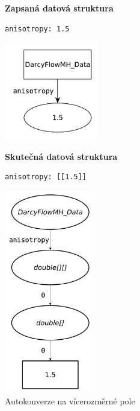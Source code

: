 \documentclass[FM,bw,DP]{tulthesis}
\begin{document}
\begin{figure}[ht]
\begin{minipage}[t]{0.45\linewidth}
\vspace{0pt}
\textbf{Zapsaná datová struktura}\\
\vspace{-5pt}
\begin{lstlisting}
anisotropy: 1.5
\end{lstlisting}
\vspace*{-20pt}
\begin{center}
\includegraphics[height=120pt]{../img/autoconversion_array_2_before.pdf}
\end{center}
\end{minipage}
\quad
\begin{minipage}[t]{0.45\linewidth}
\vspace{0pt}
\textbf{Skutečná datová struktura}\\
\vspace{-5pt}
\begin{lstlisting}
anisotropy: [[1.5]]
\end{lstlisting}
\vspace*{-20pt}
\begin{center}
\includegraphics[height=250pt]{../img/autoconversion_array_2_after.pdf}
\end{center}
\end{minipage}
\caption{Autokonverze na vícerozměrné pole}
\label{img:autoconversion_array_2}
\end{figure}	
\end{document}
